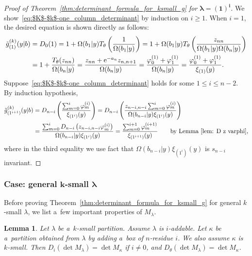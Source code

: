 \documentclass[pdftex]{sigma}
\numberwithin{equation}{section}
\newcommand{\co}{\xi}
\newcommand{\la}{\lambda}
\newtheorem{Lemma}[Theorem]{Lemma}
\theoremstyle{definition}
\begin{document}
\begin{proof}[Proof of Theorem~\ref{thm:determinant_formula_for_ksmall_g} for $\boldsymbol{\la=(1)^i}$]
We show~\eqref{eq:$K$-$k$-one_column_determinant} by induction on $i\geq 1$.
When $i=1$, the desired equation is shown directly as follows:
\begin{align*}
\tilde{g}^{(k)}_{(1)}(y|b)
&=D_0(1)=
1+\Omega(b_1|y) T_\theta\left(\frac{1}{\Omega(b_1|y)}\right)
=
1+\Omega(b_1|y) T_\theta\left(\frac{z_{nn}}{\Omega(b_1|y)\Omega(b_n|y)}\right)\\
&=1+\frac{T_\theta(z_{nn})}{\Omega(b_n|y)}
=\frac{z_{nn}+{\rm e}^{-a_n}z_{n,n+1}}{\Omega(b_n|y)}
=\frac{\varphi^{(1)}_0+\varphi^{(1)}_1}{\Omega(b_n|y)}
=\frac{\varphi^{(1)}_0+\varphi^{(1)}_1}{\co_{(1)}(y)}.
\end{align*}
Suppose~\eqref{eq:$K$-$k$-one_column_determinant} holds for some $1\le i\le n-2$.
By induction hypothesis,
\begin{align*}
\tilde{g}^{(k)}_{(1^{i+1})}(y|b)
&=D_{n-i}\left(
\frac{\sum_{m=0}^{i}\varphi^{(i)}_m}{\co_{(1^i)}(y)}
\right)=
D_{n-i}\left(
\frac{z_{n-i,n-i}\sum_{m=0}^{i}{{\varphi}}^{(i)}_m}{\Omega(b_{n-i}|y)\co_{(1^i)}(y)} \right)
\\
&=
\frac{
\sum_{m=0}^{i}D_{n-i}\left({z_{n-i,n-i}{\varphi}}^{(i)}_m\right) }{\Omega(b_{n-i}|y)\co_{(1^i)}(y)}=
\frac{
\sum_{m=0}^{i+1}\varphi^{(i+1)}_m }{\co_{(1^{i+1})}(y)}\qquad\text{by Lemma~\ref{lem: D z varphi}},
\end{align*}
where in the third equality we use
fact that $\Omega(b_{n-i}|y)\co_{(1^i)}(y)$ is $s_{n-i}$ invariant.
\end{proof}

\subsubsection[Case: general k-small la]{Case: general $\boldsymbol{k}$-small $\boldsymbol{\la}$}
Before proving Theorem~\ref{thm:determinant_formula_for_ksmall_g} for general $k$-small $\lambda$, we list a~few important properties of ${M}_\lambda$.




\begin{Lemma}\label{lem:comparing_determinants}
Let $\lambda$ be a~$k$-small partition.
Assume $\la$ is $i$-addable.
Let $\kappa$ be a~partition
obtained from $\lambda$ by adding a~box of $n$-residue $i$. We also assume $\kappa$ is $k$-small.
Then
$
 D_i(\det M_\lambda)=\det M_\kappa $ if $i\neq 0$, and $
D_\theta(\det M_\lambda)=\det M_\kappa$.
\end{Lemma}
\end{document}
